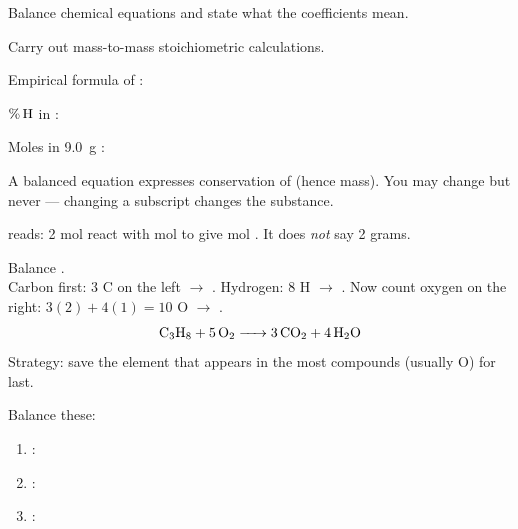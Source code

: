 \documentclass{apchem-notes}
\begin{document}

\begin{objectives}
  \item Balance chemical equations and state what the coefficients mean.
  \item Carry out mass-to-mass stoichiometric calculations.
\end{objectives}


\begin{warmup}[3]
  \item Empirical formula of : 
  \item $\%\,\ce{H}$ in : 
  \item Moles in \SI{9.0}{\gram} : 
\end{warmup}



A balanced equation expresses conservation of
 (hence mass). You may change
 but never
 --- changing a subscript changes the
substance.


 reads: 2 mol  react with
 mol  to give  mol
. It does \emph{not} say 2 grams.

\begin{workedexample}
Balance .\\
Carbon first: 3 C on the left $\to$ . Hydrogen: 8 H $\to$
. Now count oxygen on the right: $3(2) + 4(1) = 10$ O $\to$
.
\[
  \ce{C3H8 + 5 O2 -> 3 CO2 + 4 H2O}
\]
Strategy: save the element that appears in the most compounds (usually O)
for last.
\end{workedexample}

Balance these:
\begin{enumerate}[leftmargin=*,itemsep=0.35em]
  \item {}:
  \item {}:
  \item {}:
\end{enumerate}
\end{document}
